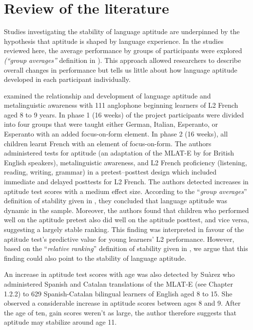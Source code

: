 \documentclass[output=paper]{langsci/langscibook}
\begin{document}
\section{Review of the literature} 

Studies investigating the stability of language aptitude are underpinned by the hypothesis that aptitude is shaped by language experience. In the studies reviewed here, the average performance by groups of participants were explored \textit{(“group averages”} definition in ). This approach allowed researchers to describe overall changes in performance but tells us little about how language aptitude developed in each participant individually. 

\citet{RoehrBrackinTellier2019} examined the relationship and development of language aptitude and metalinguistic awareness with 111 anglophone beginning learners of L2 French aged 8 to 9 years. In phase 1 (16 weeks) of the project participants were divided into four groups that were taught either German, Italian, Esperanto, or Esperanto with an added focus-on-form element. In phase 2 (16 weeks), all children learnt French with an element of focus-on-form. The authors administered tests for aptitude (an adaptation of the MLAT-E by \citet{CarrollSapon1976} for British English speakers), metalinguistic awareness, and L2 French proficiency (listening, reading, writing, grammar) in a pretest--posttest design which included immediate and delayed posttests for L2 French. The authors detected increases in aptitude test scores with a medium effect size. According to the “\textit{group averages}” definition of stability given in , they concluded that language aptitude was dynamic in the sample. Moreover, the authors found that children who performed well on the aptitude pretest also did well on the aptitude posttest, and vice versa, suggesting a largely stable ranking. This finding was interpreted in favour of the aptitude test’s predictive value for young learners’ L2 performance. However, based on the “\textit{relative ranking}” definition of stability given in , we argue that this finding could also point to the stability of language aptitude.

An increase in aptitude test scores with age was also detected by Suàrez  who administered Spanish and Catalan translations of the MLAT-E (see Chapter 1.2.2) to 629 Spanish-Catalan bilingual learners of English aged 8 to 15. She observed a considerable increase in aptitude scores between ages 8 and 9. After the age of ten, gain scores weren’t as large, the author therefore suggests that aptitude may stabilize around age 11.
\end{document}
